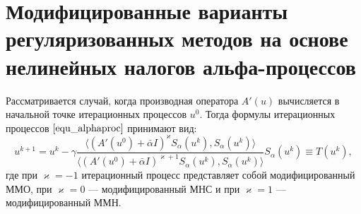 \section{Модифицированные варианты регуляризованных методов на основе нелинейных налогов альфа-процессов}
Рассматривается случай, когда производная оператора $A'(u)$ вычисляется в начальной точке итерационных процессов $u^0$. Тогда формулы итерационных процессов $\eqref{equ_alphaproc}$ принимают вид:
\begin{equation}\label{modalphaproc}
u^{k+1}=u^k-\gamma\frac{\langle (A'(u^0)+\bar\alpha I)^{\varkappa}S_\alpha(u^k), S_\alpha(u^k)\rangle}{\langle (A'(u^0)+\bar\alpha I)^{\varkappa+1}S_\alpha(u^k), S_\alpha(u^k)\rangle}S_\alpha(u^k)\equiv T(u^k),
\end{equation}
где при $\varkappa=-1$ итерационный процесс представляет собой модифицированный ММО, при $\varkappa=0$ --- модифицированный МНС и при $\varkappa=1$ --- модифицированный ММН.

